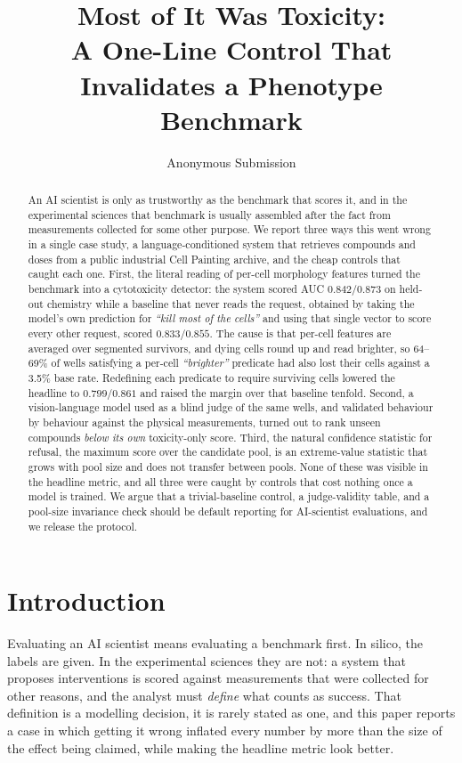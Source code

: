 \documentclass[letterpaper]{article}
\title{Most of It Was Toxicity:\\
A One-Line Control That Invalidates a Phenotype Benchmark}
\author{Anonymous Submission}
\begin{document}
\maketitle

\begin{abstract}
An AI scientist is only as trustworthy as the benchmark that scores it, and in the
experimental sciences that benchmark is usually assembled after the fact from
measurements collected for some other purpose. We report three ways this went wrong
in a single case study, a language-conditioned system that retrieves compounds and
doses from a public industrial Cell Painting archive, and the cheap controls that
caught each one. First, the literal reading of per-cell morphology features turned the
benchmark into a cytotoxicity detector: the system scored AUC $0.842/0.873$ on held-out
chemistry while a baseline that never reads the request, obtained by taking the model's
own prediction for \emph{``kill most of the cells''} and using that single vector to
score every other request, scored $0.833/0.855$. The cause is that per-cell features
are averaged over segmented survivors, and dying cells round up and read brighter, so
64--69\% of wells satisfying a per-cell \emph{``brighter''} predicate had also lost
their cells against a 3.5\% base rate. Redefining each predicate to require surviving
cells lowered the headline to $0.799/0.861$ and raised the margin over that baseline
tenfold. Second, a vision-language model used as a blind judge of the same wells, and
validated behaviour by behaviour against the physical measurements, turned out to rank
unseen compounds \emph{below its own} toxicity-only score. Third, the natural
confidence statistic for refusal, the maximum score over the candidate pool, is an
extreme-value statistic that grows with pool size and does not transfer between pools.
None of these was visible in the headline metric, and all three were caught by controls
that cost nothing once a model is trained. We argue that a trivial-baseline control, a
judge-validity table, and a pool-size invariance check should be default reporting for
AI-scientist evaluations, and we release the protocol.
\end{abstract}

\section{Introduction}

Evaluating an AI scientist means evaluating a benchmark first. In silico, the labels
are given. In the experimental sciences they are not: a system that proposes
interventions is scored against measurements that were collected for other reasons,
and the analyst must \emph{define} what counts as success. That definition is a
modelling decision, it is rarely stated as one, and this paper reports a case in which
getting it wrong inflated every number by more than the size of the effect being
claimed, while making the headline metric look better.
\end{document}
